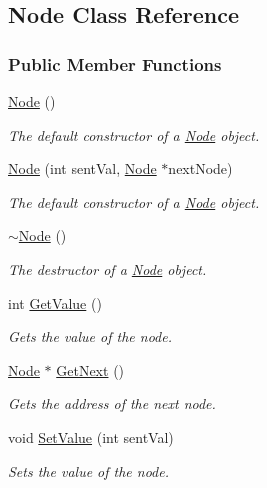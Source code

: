 \hypertarget{class_node}{}\subsection{Node Class Reference}
\label{class_node}
\subsubsection*{Public Member Functions}
\begin{DoxyCompactItemize}
\item 
\hyperlink{class_node_ad7a34779cad45d997bfd6d3d8043c75f}{Node} ()
\begin{DoxyCompactList}\small\item\em The default constructor of a \hyperlink{class_node}{Node} object. \end{DoxyCompactList}\item 
\hyperlink{class_node_a221241000bbe26054dfede000b1c6514}{Node} (int sent\+Val, \hyperlink{class_node}{Node} $\ast$next\+Node)
\begin{DoxyCompactList}\small\item\em The default constructor of a \hyperlink{class_node}{Node} object. \end{DoxyCompactList}\item 
\hyperlink{class_node_aa0840c3cb5c7159be6d992adecd2097c}{$\sim$\+Node} ()
\begin{DoxyCompactList}\small\item\em The destructor of a \hyperlink{class_node}{Node} object. \end{DoxyCompactList}\item 
int \hyperlink{class_node_aec66854a085f55a1975e6ebc42162af5}{Get\+Value} ()
\begin{DoxyCompactList}\small\item\em Gets the value of the node. \end{DoxyCompactList}\item 
\hyperlink{class_node}{Node} $\ast$ \hyperlink{class_node_a6f8729374beb27838792dc6ef81124e8}{Get\+Next} ()
\begin{DoxyCompactList}\small\item\em Gets the address of the next node. \end{DoxyCompactList}\item 
void \hyperlink{class_node_a25817de328eb9efbb95dda1219d8968f}{Set\+Value} (int sent\+Val)
\begin{DoxyCompactList}\small\item\em Sets the value of the node. \end{DoxyCompactList}\item 

\end{DoxyCompactItemize}
